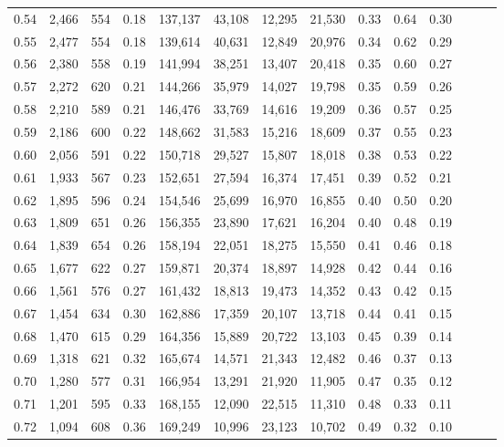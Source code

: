 \begin{tabular}{rrrrrrrrrrrrrr}
0.54 &  2,466 &  554 &  0.18 &  137,137 &   43,108 &  12,295 &  21,530 &  0.33 &  0.64 &      0.30 \\
0.55 &  2,477 &  554 &  0.18 &  139,614 &   40,631 &  12,849 &  20,976 &  0.34 &  0.62 &      0.29 \\
0.56 &  2,380 &  558 &  0.19 &  141,994 &   38,251 &  13,407 &  20,418 &  0.35 &  0.60 &      0.27 \\
0.57 &  2,272 &  620 &  0.21 &  144,266 &   35,979 &  14,027 &  19,798 &  0.35 &  0.59 &      0.26 \\
0.58 &  2,210 &  589 &  0.21 &  146,476 &   33,769 &  14,616 &  19,209 &  0.36 &  0.57 &      0.25 \\
0.59 &  2,186 &  600 &  0.22 &  148,662 &   31,583 &  15,216 &  18,609 &  0.37 &  0.55 &      0.23 \\
0.60 &  2,056 &  591 &  0.22 &  150,718 &   29,527 &  15,807 &  18,018 &  0.38 &  0.53 &      0.22 \\
0.61 &  1,933 &  567 &  0.23 &  152,651 &   27,594 &  16,374 &  17,451 &  0.39 &  0.52 &      0.21 \\
0.62 &  1,895 &  596 &  0.24 &  154,546 &   25,699 &  16,970 &  16,855 &  0.40 &  0.50 &      0.20 \\
0.63 &  1,809 &  651 &  0.26 &  156,355 &   23,890 &  17,621 &  16,204 &  0.40 &  0.48 &      0.19 \\
0.64 &  1,839 &  654 &  0.26 &  158,194 &   22,051 &  18,275 &  15,550 &  0.41 &  0.46 &      0.18 \\
0.65 &  1,677 &  622 &  0.27 &  159,871 &   20,374 &  18,897 &  14,928 &  0.42 &  0.44 &      0.16 \\
0.66 &  1,561 &  576 &  0.27 &  161,432 &   18,813 &  19,473 &  14,352 &  0.43 &  0.42 &      0.15 \\
0.67 &  1,454 &  634 &  0.30 &  162,886 &   17,359 &  20,107 &  13,718 &  0.44 &  0.41 &      0.15 \\
0.68 &  1,470 &  615 &  0.29 &  164,356 &   15,889 &  20,722 &  13,103 &  0.45 &  0.39 &      0.14 \\
0.69 &  1,318 &  621 &  0.32 &  165,674 &   14,571 &  21,343 &  12,482 &  0.46 &  0.37 &      0.13 \\
0.70 &  1,280 &  577 &  0.31 &  166,954 &   13,291 &  21,920 &  11,905 &  0.47 &  0.35 &      0.12 \\
0.71 &  1,201 &  595 &  0.33 &  168,155 &   12,090 &  22,515 &  11,310 &  0.48 &  0.33 &      0.11 \\
0.72 &  1,094 &  608 &  0.36 &  169,249 &   10,996 &  23,123 &  10,702 &  0.49 &  0.32 &      0.10 \\

\end{tabular}
